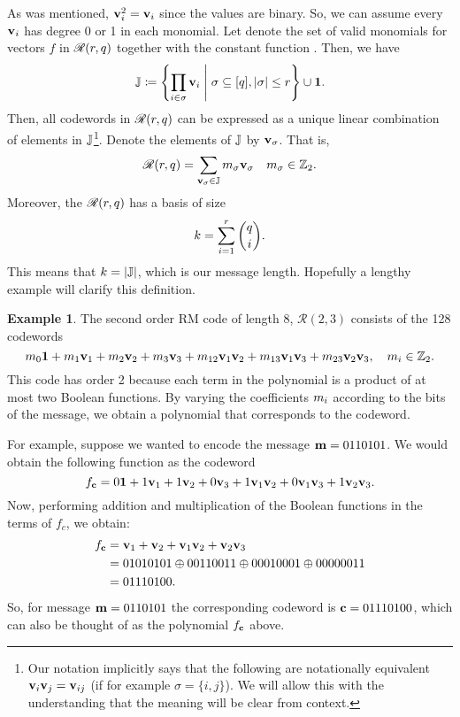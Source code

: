 \documentclass[12pt,twoside]{reedthesis}
\theoremstyle{definition}
\newtheorem{example}[theorem]{Example}
\newcommand{\Z}{\mathbb{Z}}
\newcommand{\suchthat}{\;\ifnum\currentgrouptype=16 \middle\fi|\;}
\begin{document}
As was mentioned, $\mathbf{v}_{i}^2 = \mathbf{v}_{i}$ since the values are binary. So, we can  assume every $\mathbf{v}_{i}$ has degree 0 or 1 in each monomial. Let \rmexp denote the set of valid monomials for vectors $f$ in $\mathscr{R}(r, q)$ together with the constant function \consto. Then, we have
\begin{equation*}
\rmexp \coloneqq 
\left \{
	\prod_{i \in \sigma} \bv{i} \suchthat  \sigma \subseteq [\numin], \lvert \sigma \rvert \leq \degrm 
\right \} \cup \consto.
\end{equation*}
Then, all codewords in $\mathscr{R}(r, q)$ can be expressed as a unique linear combination of elements in $\mathbb{J}$\footnote{Our notation implicitly says that  the following are notationally equivalent $\mathbf{v}_{i}\mathbf{v}_{j} = \mathbf{v}_{ij}$ (if for example $\sigma = \{i, j\}$). We will allow this with the understanding that the meaning will be clear from context.}. Denote the elements of $\mathbb{J}$ by $\mathbf{v}_{\sigma}$. That is,
\begin{equation} \label{reed_muller_poly}
\mathscr{R}(\degrm, \numin) = \sum_{\bv{\sigma} \in \rmexp} \m{\sigma} \bv{\sigma}  \quad \m{\sigma} \in \Z_2.
\end{equation}
Moreover, the $\mathscr{R}(r, q)$ has a basis of size
\begin{equation}
k = \sum_{i = 1}^{r} {q \choose i}.
\end{equation}
This means that $k = \lvert \mathbb{J} \rvert$, which is our message length.
Hopefully a lengthy example will clarify this definition.
\begin{example}
The second order RM code of length 8, $\mathscr{R}(2,3)$ consists of the 128 codewords
\begin{equation*} 
\m{0}\consto + \m{1}\bv{1} + \m{2}\bv{2} + \m{3}\bv{3} + \m{12}\bv{1}\bv{2} + \m{13}\bv{1}\bv{3} + \m{23}\bv{2}\bv{3}, \quad \m{i} \in \Z_2. 
\end{equation*}
This code has order 2 because each term in the polynomial is a product of at most two Boolean functions. By varying the coefficients $m_{i}$ according to the bits of the message, we obtain a polynomial that corresponds to the codeword. 

For example, suppose we wanted to encode the message $\mathbf{m} = 0110101$. We would obtain the following function as the codeword
\begin{equation*}
f_\mathbf{c} = 0\mathbf{1} + 1\mathbf{v}_{1} + 1\mathbf{v}_{2} + 0\mathbf{v}_{3} + 1\mathbf{v}_{1}\mathbf{v}_{2} + 0\mathbf{v}_{1}\mathbf{v}_{3} + 1\mathbf{v}_{2}\mathbf{v}_{3}.
\end{equation*}
Now, performing addition and multiplication of the Boolean functions in the terms of $f_c$, we obtain: 
\begin{align*}
f_\mathbf{c} 
& =  \mathbf{v}_{1} + \mathbf{v}_{2} + \mathbf{v}_{1}\mathbf{v}_{2} + \mathbf{v}_{2}\mathbf{v}_{3}\\
& = 01010101 \oplus 00110011 \oplus 00010001 \oplus 00000011 \\
& = 01110100.
\end{align*}
So, for message $\mathbf{m} = 0110101$ the corresponding codeword is $\mathbf{c}=01110100$, which can also be thought of as the polynomial $f_\mathbf{c}$ above.
\end{example}
\end{document}
